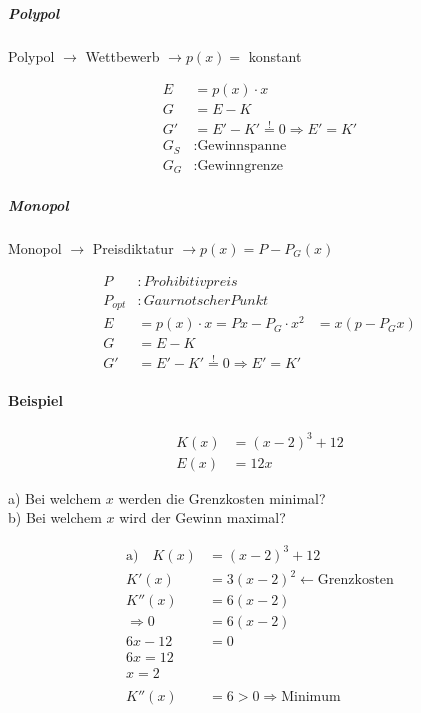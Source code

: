 \subparagraph{Polypol}

Polypol \( \rightarrow \) Wettbewerb \( \rightarrow p(x) = \) konstant

\begin{align*}
	E   & = p(x) \cdot x                                 \\
	G   & = E - K                                        \\
	G'  & = E' - K' \overset{!}{=} 0 \Rightarrow E' = K' \\
	G_S & : \text{Gewinnspanne}                          \\
	G_G & : \text{Gewinngrenze}
\end{align*}

\subparagraph{Monopol}

Monopol \( \rightarrow \) Preisdiktatur \( \rightarrow p(x) = P - P_G(x) \)

\begin{align*}
	P       & : Prohibitivpreis                                               \\
	P_{opt} & : Gaurnotscher Punkt                                            \\
	E       & = p(x) \cdot x = Px - P_G \cdot x^2            & = x(p - P_G x) \\
	G       & = E - K                                                         \\
	G'      & = E' - K' \overset{!}{=} 0 \Rightarrow E' = K'
\end{align*}

\paragraph{Beispiel}

\begin{align*}
	K(x) & = {(x - 2)}^3 + 12 \\
	E(x) & = 12x
\end{align*}

a) Bei welchem \( x \) werden die Grenzkosten minimal? \\
b) Bei welchem \( x \) wird der Gewinn maximal?

\begin{align*}
	\text{a)}\quad K(x) & = {(x-2)}^3 + 12                           \\
	K'(x)               & = 3{(x-2)}^2 \leftarrow \text{Grenzkosten} \\
	K''(x)              & = 6(x-2)                                   \\
	\Rightarrow 0       & = 6(x-2)                                   \\
	6x - 12             & = 0                                        \\
	6x = 12                                                          \\
	x = 2                                                            \\
	\\
	K''(x)              & = 6 > 0 \Rightarrow \text{Minimum}
\end{align*}


